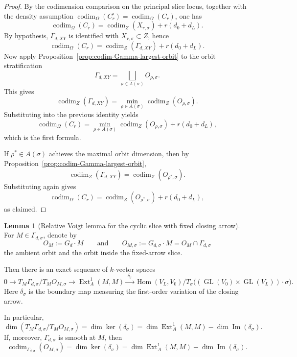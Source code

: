 \documentclass{article}
\newcommand{\Hom}{\operatorname{Hom}}
\newcommand{\codim}{\operatorname{codim}}
\newcommand{\Ext}{\operatorname{Ext}}
\newcommand{\GL}{\operatorname{GL}}
\theoremstyle{definition}
\newtheorem{lemma}[theorem]{Lemma}
\begin{document}
\begin{proof}
By the codimension comparison on the principal slice locus, together with the density assumption
$\codim_\Omega(C_r^\circ)=\codim_\Omega(C_r)$, one has
\[
\codim_\Omega(C_r)
=
\codim_Z(X_{r,\sigma})
+
r(d_0+d_L).
\]
By hypothesis, $\Gamma_{d,XY}$ is identified with $X_{r,\sigma}\subset Z$, hence
\[
\codim_\Omega(C_r)
=
\codim_Z(\Gamma_{d,XY})
+
r(d_0+d_L).
\]
Now apply Proposition~\ref{prop:codim-Gamma-largest-orbit} to the orbit stratification
\[
\Gamma_{d,XY}
=
\bigsqcup_{\rho\in A(\sigma)} O_{\rho,\sigma}.
\]
This gives
\[
\codim_Z(\Gamma_{d,XY})
=
\min_{\rho\in A(\sigma)} \codim_Z(O_{\rho,\sigma}).
\]
Substituting into the previous identity yields
\[
\codim_\Omega(C_r)
=
\min_{\rho\in A(\sigma)} \codim_Z(O_{\rho,\sigma})
+
r(d_0+d_L),
\]
which is the first formula.

If $\rho^\ast\in A(\sigma)$ achieves the maximal orbit dimension, then by
Proposition~\ref{prop:codim-Gamma-largest-orbit},
\[
\codim_Z(\Gamma_{d,XY})
=
\codim_Z(O_{\rho^\ast,\sigma}).
\]
Substituting again gives
\[
\codim_\Omega(C_r)
=
\codim_Z(O_{\rho^\ast,\sigma})
+
r(d_0+d_L),
\]
as claimed.
\end{proof}
\begin{lemma}[Relative Voigt lemma for the cyclic slice with fixed closing arrow]\label{lem:relative-voigt-cyclic-slice} For \(M\in \Gamma_{d,\sigma}\), denote by
\[
O_M:=G_d\cdot M
\qquad\text{and}\qquad
O_{M,\sigma}:=G_{d,\sigma}\cdot M=O_M\cap \Gamma_{d,\sigma}
\]
the ambient orbit and the orbit inside the fixed-arrow slice.

Then there is an exact sequence of \(k\)-vector spaces
\[
0
\longrightarrow
T_M\Gamma_{d,\sigma}/T_M O_{M,\sigma}
\longrightarrow
\Ext_A^1(M,M)
\xrightarrow{\;\delta_\sigma\;}
\Hom(V_L,V_0)\big/ T_\sigma\!\bigl((\GL(V_0)\times \GL(V_L))\cdot \sigma\bigr).
\]
Here \(\delta_\sigma\) is the boundary map measuring the first-order variation of the closing arrow.

In particular,
\[
\dim\!\left(T_M\Gamma_{d,\sigma}/T_M O_{M,\sigma}\right)
=
\dim \ker(\delta_\sigma)
=
\dim \Ext_A^1(M,M)-\dim \operatorname{Im}(\delta_\sigma).
\]
If, moreover, \(\Gamma_{d,\sigma}\) is smooth at \(M\), then
\[
\codim_{\Gamma_{d,\sigma}}(O_{M,\sigma})
=
\dim \ker(\delta_\sigma)
=
\dim \Ext_A^1(M,M)-\dim \operatorname{Im}(\delta_\sigma).
\]
\end{lemma}
\end{document}
